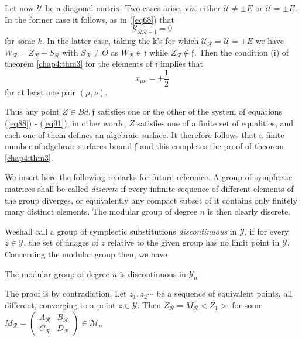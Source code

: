 Let now $\mathcal{U}$ be a diagonal matrix. Two cases arise,
viz. either $\mathcal{U} \neq \pm E$ or $\mathcal{U} = \pm E$. In
the former case it follows, as in (\ref{eq68}) that  
 \begin{equation*}
\mathscr{Y}_{\mathscr{R} \mathscr{R} + 1} = 0 \tag{90}\label{eq90}   
 \end{equation*} 
for some $k$. In the latter case, taking the k's for which
$\mathscr{U}_{\mathscr{R}}= \mathscr{U} = \pm E$ we have
$W_{\mathscr{R}} = Z_{\mathscr{R}}+ S_{\mathscr{R}}$ with
$S_{\mathscr{R}} \neq O$ as $W_{\mathscr{R}} \in \mathfrak{f}$ while
$Z_{\mathscr{R}} \notin \mathfrak{f}$. Then the condition (i) of
theorem \ref{chap4:thm3} for the elements of $\mathfrak{f}$ implies that  
\begin{equation*}
x_{\mu \nu} = \pm \frac{1}{2} \tag{91}\label{eq91}   
\end{equation*}
for at least one pair $(\mu, \nu)$.

Thus any point $Z \in Bd ,\mathfrak{f}$ satisfies one or the other of
the system of equations (\ref{eq88}) - (\ref{eq91}), in other words,
$Z$ satisfies 
one of a finite set of equalities, and each one of them defines an
algebraic surface. It therefore follows that a finite number of
algebraic surfaces bound $\mathfrak{f}$ and this completes the proof of
theorem \ref{chap4:thm3}. 

We insert here the following remarks for future reference. A group of
symplectic matrices shall be called \textit{discrete} if every
infinite sequence of different elements of the group diverges,
or equivalently any compact subset of it contains only finitely many
distinct elements. The modular group of degree $n$ is then clearly
discrete. 

We\pageoriginale shall call a group of symplectic substitutions
\textit{discontinuous} in $\mathscr{Y}$, if for every $z \in
\mathscr{Y}$, the set of images of $z$ relative to the given group has
no limit point in $\mathscr{Y}$. Concerning the modular group then, we
have  

\setcounter{lem}{7}
\begin{lem}\label{chap4:lem8}%
 The modular group of degree $n$ is discontinuous in
  $\mathscr{Y}_n$ 
\end{lem}

The proof is by contradiction. Let $z_1, z_2 \cdots$ be a sequence of
equivalent points, all different, converging to a point $z \in
\mathscr{Y}$. Then $Z_{\mathscr{R}} = M_{\mathscr{R}} < Z_1>$ for some
$M_{\mathscr{R}} = \begin{pmatrix} A_{\mathscr{R}} & B_{\mathscr{R}}
  \\ C_{\mathscr{R}} & D_{\mathscr{R}} \end{pmatrix} \in \mathcal{M}_n$ 


